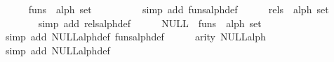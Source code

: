 \begin{isabellebody}
\isanewline
\ \ \ \ \isamarkupfalse%
\ {}{}funs\ {}{}\ alph\ set{}\ {}\ {}{}{}\isanewline
\ \ \ \ \ \ \isamarkupfalse%
\ {}simp\ add{}\ funs{}alph{}def{}\isanewline
\isanewline
\ \ \ \ \isamarkupfalse%
\ {}{}rels\ {}{}\ alph\ set{}\ {}\ {}{}{}\isanewline
\ \ \ \ \ \ \isamarkupfalse%
\ {}simp\ add{}\ rels{}alph{}def{}\isanewline
\isanewline
\ \ \ \ \isamarkupfalse%
\ {}NULL\ {}\ {}funs\ {}{}\ alph\ set{}{}\isanewline
\ \ \ \ \ \ \isamarkupfalse%
\ {}simp\ add{}\ NULL{}alph{}def\ funs{}alph{}def{}\isanewline
\isanewline
\ \ \ \ \isamarkupfalse%
\ {}arity\ {}NULL{}{}alph{}\ {}\ {}{}\isanewline
\ \ \ \ \ \ \isamarkupfalse%
\ {}simp\ add{}\ NULL{}alph{}def{}\isanewline

\end{isabellebody}
